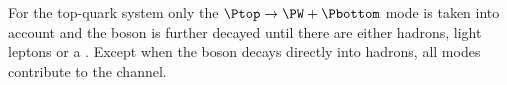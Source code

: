 \begin{comment}
For \Htautau:
\begin{itemize}
	\item  BR($\tautau \rightarrow \emu + \emu)= 12.41\%$
	\item  BR($\tautau \rightarrow \emu + \tauhad)= 45.63\%$
	\item  BR($\tautau \rightarrow$ Hadrons)$= 41.51\%$
\end{itemize}

For \HWW the first two elements of the list take part 
in the \dileptau signature when the \tauhad comes from 
the \Ptop quark in the first item and the \PHiggs boson
in the second. 
\begin{itemize}
	\item  BR($\WW \rightarrow \emu +\emu)= 6.42\%$ 
	\item  BR($\WW \rightarrow \emu +\tauhad)= 3.73\%$
	\item  BR($\WW \rightarrow \emu$ +$\,$Hadrons$)= 34.17\%$
	\item  BR($\WW \rightarrow$ Hadrons)$= 55.92\%$
\end{itemize}

For the \ZZ, the $\ZZ \rightarrow 2 \times \emu$ contributes 
to the \dileptau signature when the \tauhad is produced in the
top-quark system. When the top quark decays into a 
light lepton, the $\ZZ \rightarrow \emu + \tauhad$ mode contributes
to the \dileptau final state.
\begin{itemize}
	\item  BR($\ZZ \rightarrow 4 \times \emu)= 0.52\%$ 
	\item  BR($\ZZ \rightarrow 2 \times \emu)= 12.85\%$
	\item  BR($\ZZ \rightarrow \emu +\tauhad)= 12.85\%$
	\item  BR($\ZZ \rightarrow 4 \times \nu$+Hadrons$)= 80.82\%$
	\item  BR($\ZZ \rightarrow 2 \times \tauhad)= 2.82\%$	
	\item  BR($\ZZ \rightarrow 3 \times \emu + \tauhad)= 0.22\%$
\end{itemize}
\end{comment}

For the top-quark system only the $\Ptop \rightarrow \PW + \Pbottom$
mode is taken into account and the \PW boson is further decayed until there are
either hadrons, light leptons or a \tauhad. Except when the \PW boson decays directly
into hadrons, all modes contribute to the \dileptau channel.


